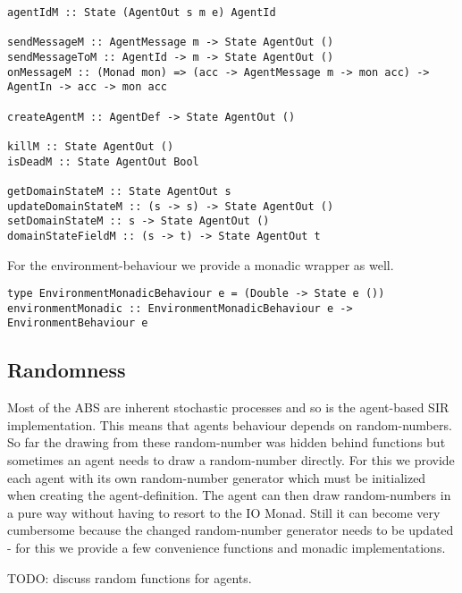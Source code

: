 \begin{verbatim}
agentIdM :: State (AgentOut s m e) AgentId

sendMessageM :: AgentMessage m -> State AgentOut ()
sendMessageToM :: AgentId -> m -> State AgentOut ()
onMessageM :: (Monad mon) => (acc -> AgentMessage m -> mon acc) -> AgentIn -> acc -> mon acc

createAgentM :: AgentDef -> State AgentOut ()

killM :: State AgentOut ()
isDeadM :: State AgentOut Bool

getDomainStateM :: State AgentOut s
updateDomainStateM :: (s -> s) -> State AgentOut ()
setDomainStateM :: s -> State AgentOut ()
domainStateFieldM :: (s -> t) -> State AgentOut t
\end{verbatim}

For the environment-behaviour we provide a monadic wrapper as well.

\begin{verbatim}
type EnvironmentMonadicBehaviour e = (Double -> State e ())
environmentMonadic :: EnvironmentMonadicBehaviour e -> EnvironmentBehaviour e
\end{verbatim}

\subsection{Randomness}
Most of the ABS are inherent stochastic processes and so is the agent-based SIR implementation. This means that agents behaviour depends on random-numbers. So far the drawing from these random-number was hidden behind functions but sometimes an agent needs to draw a random-number directly. For this we provide each agent with its own random-number generator which must be initialized when creating the agent-definition. The agent can then draw random-numbers in a pure way without having to resort to the IO Monad. Still it can become very cumbersome because the changed random-number generator needs to be updated - for this we provide a few convenience functions and monadic implementations.

TODO: discuss random functions for agents.